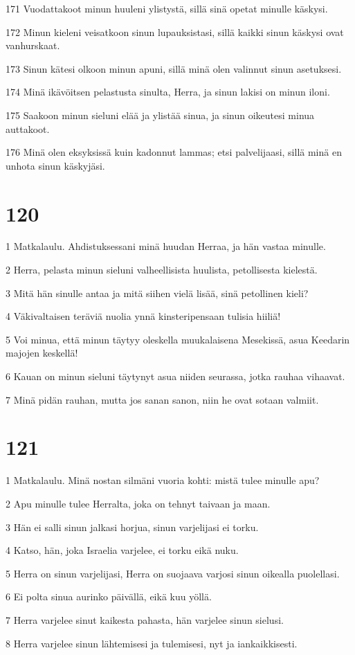 \par 171 Vuodattakoot minun huuleni ylistystä, sillä sinä opetat minulle käskysi.
\par 172 Minun kieleni veisatkoon sinun lupauksistasi, sillä kaikki sinun käskysi ovat vanhurskaat.
\par 173 Sinun kätesi olkoon minun apuni, sillä minä olen valinnut sinun asetuksesi.
\par 174 Minä ikävöitsen pelastusta sinulta, Herra, ja sinun lakisi on minun iloni.
\par 175 Saakoon minun sieluni elää ja ylistää sinua, ja sinun oikeutesi minua auttakoot.
\par 176 Minä olen eksyksissä kuin kadonnut lammas; etsi palvelijaasi, sillä minä en unhota sinun käskyjäsi.

\chapter{120}

\par 1 Matkalaulu. Ahdistuksessani minä huudan Herraa, ja hän vastaa minulle.
\par 2 Herra, pelasta minun sieluni valheellisista huulista, petollisesta kielestä.
\par 3 Mitä hän sinulle antaa ja mitä siihen vielä lisää, sinä petollinen kieli?
\par 4 Väkivaltaisen teräviä nuolia ynnä kinsteripensaan tulisia hiiliä!
\par 5 Voi minua, että minun täytyy oleskella muukalaisena Mesekissä, asua Keedarin majojen keskellä!
\par 6 Kauan on minun sieluni täytynyt asua niiden seurassa, jotka rauhaa vihaavat.
\par 7 Minä pidän rauhan, mutta jos sanan sanon, niin he ovat sotaan valmiit.

\chapter{121}

\par 1 Matkalaulu. Minä nostan silmäni vuoria kohti: mistä tulee minulle apu?
\par 2 Apu minulle tulee Herralta, joka on tehnyt taivaan ja maan.
\par 3 Hän ei salli sinun jalkasi horjua, sinun varjelijasi ei torku.
\par 4 Katso, hän, joka Israelia varjelee, ei torku eikä nuku.
\par 5 Herra on sinun varjelijasi, Herra on suojaava varjosi sinun oikealla puolellasi.
\par 6 Ei polta sinua aurinko päivällä, eikä kuu yöllä.
\par 7 Herra varjelee sinut kaikesta pahasta, hän varjelee sinun sielusi.
\par 8 Herra varjelee sinun lähtemisesi ja tulemisesi, nyt ja iankaikkisesti.

